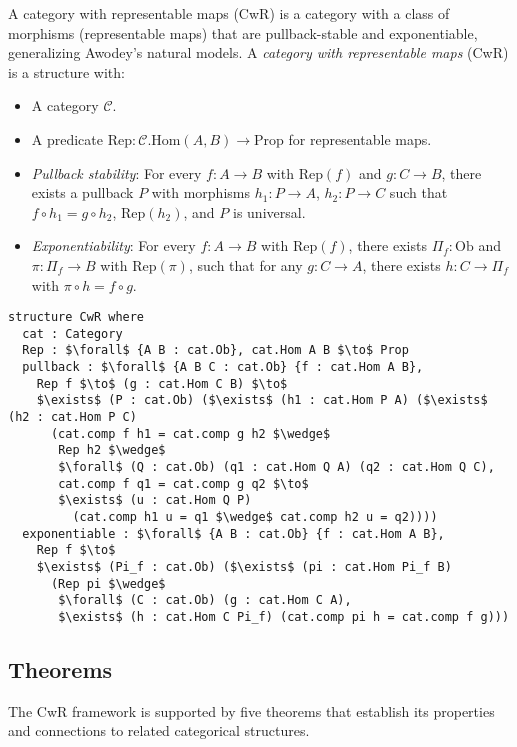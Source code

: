 \documentclass{article}
\begin{document}
\begin{definition}[CwR]
A category with representable maps (CwR) is a category with a class of
morphisms (representable maps) that are pullback-stable and exponentiable, generalizing Awodey’s natural models.
A \emph{category with representable maps} (CwR) is a structure with:
\begin{itemize}
  \item A category $\mathcal{C}$.
  \item A predicate $\text{Rep} : \mathcal{C}.\text{Hom}(A, B) \to \text{Prop}$ for representable maps.
  \item \emph{Pullback stability}: For every $f : A \to B$ with $\text{Rep}(f)$ and $g : C \to B$, there exists a pullback $P$ with morphisms $h_1 : P \to A$, $h_2 : P \to C$ such that $f \circ h_1 = g \circ h_2$, $\text{Rep}(h_2)$, and $P$ is universal.
  \item \emph{Exponentiability}: For every $f : A \to B$ with $\text{Rep}(f)$, there exists $\Pi_f : \text{Ob}$ and $\pi : \Pi_f \to B$ with $\text{Rep}(\pi)$, such that for any $g : C \to A$, there exists $h : C \to \Pi_f$ with $\pi \circ h = f \circ g$.
\end{itemize}
\end{definition}

\begin{lstlisting}[mathescape=true]
structure CwR where
  cat : Category
  Rep : $\forall$ {A B : cat.Ob}, cat.Hom A B $\to$ Prop
  pullback : $\forall$ {A B C : cat.Ob} {f : cat.Hom A B},
    Rep f $\to$ (g : cat.Hom C B) $\to$
    $\exists$ (P : cat.Ob) ($\exists$ (h1 : cat.Hom P A) ($\exists$ (h2 : cat.Hom P C)
      (cat.comp f h1 = cat.comp g h2 $\wedge$
       Rep h2 $\wedge$
       $\forall$ (Q : cat.Ob) (q1 : cat.Hom Q A) (q2 : cat.Hom Q C),
       cat.comp f q1 = cat.comp g q2 $\to$
       $\exists$ (u : cat.Hom Q P)
         (cat.comp h1 u = q1 $\wedge$ cat.comp h2 u = q2))))
  exponentiable : $\forall$ {A B : cat.Ob} {f : cat.Hom A B},
    Rep f $\to$
    $\exists$ (Pi_f : cat.Ob) ($\exists$ (pi : cat.Hom Pi_f B)
      (Rep pi $\wedge$
       $\forall$ (C : cat.Ob) (g : cat.Hom C A),
       $\exists$ (h : cat.Hom C Pi_f) (cat.comp pi h = cat.comp f g)))
\end{lstlisting}

\newpage
\subsection{Theorems}
The CwR framework is supported by five theorems that establish
its properties and connections to related categorical structures.
\end{document}
